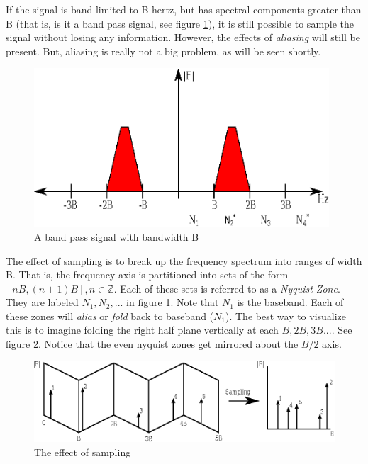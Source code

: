 \documentclass[a4paper, 12pt]{article}
\begin{document}
If the signal is band limited to B hertz, but has spectral components greater than B (that is, is it a band pass signal, see figure \ref{fig:bandpass_signal}), it is still possible to sample the signal without losing any information.  However, the effects of \textit{aliasing} will still be present.  But, aliasing is really not a big problem, as will be seen shortly.

\begin{figure}[ht]
\caption{A band pass signal with bandwidth B}
\label{fig:bandpass_signal}
\centering
\includegraphics[width=11cm]{images/bandpass_signal.eps}
\end{figure}

The effect of sampling is to break up the frequency spectrum into ranges of width B.  That is, the frequency axis is partitioned into sets of the form $[nB, (n+1)B], n \in \mathbb{Z}$.  Each of these sets is referred to as a \textit{Nyquist Zone}.  They are labeled $N_1, N_2, ...$ in figure \ref{fig:bandpass_signal}.  Note that $N_1$ is the baseband.  Each of these zones will \textit{alias} or \textit{fold} back to baseband ($N_1$).  The best way to visualize this is to imagine folding the right half plane vertically at each $B, 2B, 3B ...$.  See figure \ref{fig:bandpass_sampling}.  Notice that the even nyquist zones get mirrored about the $B/2$ axis.

\begin{figure}[ht]
\caption{The effect of sampling}
\label{fig:bandpass_sampling}
\centering
\includegraphics[width=13cm]{images/bandpass_sampling.eps}
\end{figure}
\end{document}
